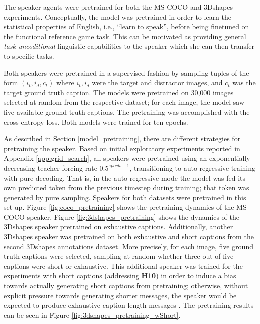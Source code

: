 The speaker agents were pretrained for both the MS COCO and 3Dshapes experiments. Conceptually, the model was pretrained in order to learn the statistical properties of English, i.e., ``learn to speak'', before being finetuned on the functional reference game task. This can be motivated as providing general \textit{task-uncoditional} linguistic capabilities to the speaker which she can then transfer to specific tasks.

Both speakers were pretrained in a supervised fashion by sampling tuples of the form $(i_t, i_d, c_t)$ where $i_t, i_d$ were the target and distractor images, and $c_t$ was the target ground truth caption. The models were pretrained on 30,000 images selected at random from the respective dataset; for each image, the model saw five available ground truth captions. 
The pretraining was accomplished with the cross-entropy loss. Both models were trained for ten epochs.

As described in Section \ref{model_pretraining}, there are different strategies for pretraining the speaker. Based on initial exploratory experiments reported in Appendix \ref{app:grid_search}, all speakers were pretrained using an exponentially decreasing teacher-forcing rate $0.5^{epoch-1}$, transitioning to auto-regressive training with pure decoding. That is, in the auto-regressive mode the model was fed its own predicted token from the previous timestep during training; that token was generated by pure sampling. Speakers for both datasets were pretrained in this set up. Figure \ref{fig:coco_pretraining} shows the pretraining dynamics of the MS COCO speaker, Figure \ref{fig:3dshapes_pretraining} shows the dynamics of the 3Dshapes speaker pretrained on exhaustive captions. Additionally, another 3Dshapes speaker was pretrained on both exhaustive and short captions from the second 3Dshapes annotations dataset. More precisely, for each image, five ground truth captions were selected, sampling at random whether three out of five captions were short or exhaustive. This additional speaker was trained for the experiments with short captions (addressing \textbf{H10}) in order to induce a bias towards actually generating short captions from pretraining; otherwise, without explicit pressure towards generating shorter messages, the speaker would be expected to produce exhaustive caption length messages \parencite[cf., e.~g.,][]{hupkes2020compositionality}. The pretraining results can be seen in Figure \ref{fig:3dshapes_pretraining_wShort}.

